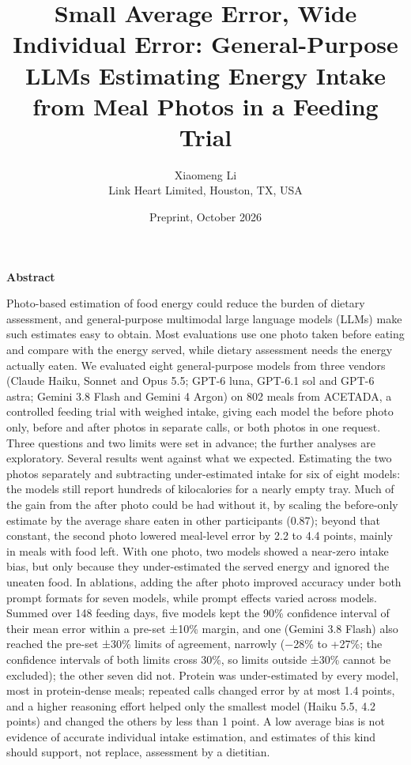 \documentclass[
  11pt,
  letterpaper]{article}
\title{Small Average Error, Wide Individual Error: General-Purpose LLMs Estimating Energy Intake from Meal
Photos in a Feeding Trial}
\author{Xiaomeng Li\\ {\normalsize Link Heart Limited, Houston, TX, USA}}
\date{Preprint, October 2026}
\renewenvironment{abstract}{\vspace{4pt}\begin{center}\large\bfseries Abstract\end{center}\vspace{-2pt}\normalsize\setlength{\parindent}{0pt}\setlength{\parskip}{6pt}}{\vspace{8pt}}
\begin{document}
\maketitle
\begin{abstract}
Photo-based estimation of food energy could reduce the burden of dietary assessment, and general-purpose
multimodal large language models (LLMs) make such estimates easy to obtain. Most evaluations use one photo
taken before eating and compare with the energy served, while dietary assessment needs the energy actually
eaten. We evaluated eight general-purpose models from three vendors (Claude Haiku, Sonnet and Opus 5.5; GPT-6
luna, GPT-6.1 sol and GPT-6 astra; Gemini 3.8 Flash and Gemini 4 Argon) on 802 meals from ACETADA, a
controlled feeding trial with weighed intake, giving each model the before photo only, before and after photos
in separate calls, or both photos in one request. Three questions and two limits were set in advance; the
further analyses are exploratory. Several results went against what we expected. Estimating the two photos
separately and subtracting under-estimated intake for six of eight models: the models still report hundreds of
kilocalories for a nearly empty tray. Much of the gain from the after photo could be had without it, by
scaling the before-only estimate by the average share eaten in other participants (0.87); beyond that
constant, the second photo lowered meal-level error by 2.2 to 4.4 points, mainly in meals with food left. With
one photo, two models showed a near-zero intake bias, but only because they under-estimated the served energy
and ignored the uneaten food. In ablations, adding the after photo improved accuracy under both prompt formats
for seven models, while prompt effects varied across models. Summed over 148 feeding days, five models kept
the 90\% confidence interval of their mean error within a pre-set ±10\% margin, and one (Gemini 3.8 Flash)
also reached the pre-set ±30\% limits of agreement, narrowly (−28\% to +27\%; the confidence intervals of both
limits cross 30\%, so limits outside ±30\% cannot be excluded); the other seven did not. Protein was
under-estimated by every model, most in protein-dense meals; repeated calls changed error by at most 1.4
points, and a higher reasoning effort helped only the smallest model (Haiku 5.5, 4.2 points) and changed the
others by less than 1 point. A low average bias is not evidence of accurate individual intake estimation, and
estimates of this kind should support, not replace, assessment by a dietitian.
\end{abstract}
\end{document}
